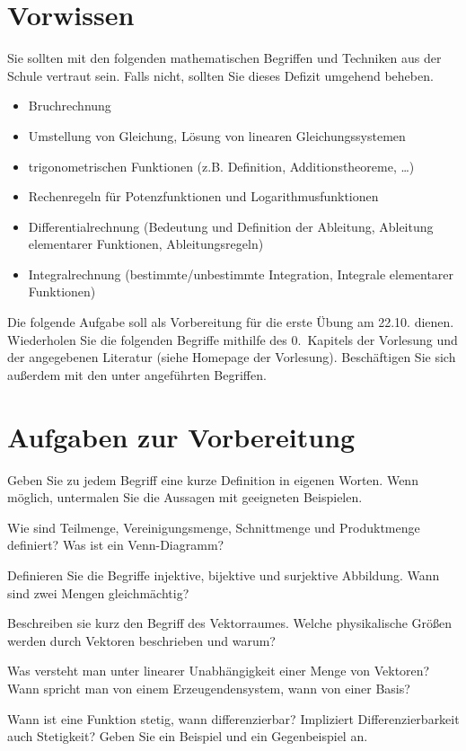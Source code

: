 \documentclass[11pt]{scrartcl}
\begin{document}
\section*{Vorwissen}
Sie sollten mit den folgenden mathematischen Begriffen und Techniken aus der Schule vertraut sein. Falls nicht, sollten Sie dieses Defizit umgehend beheben.
\begin{itemize}
  \item Bruchrechnung
  \item Umstellung von Gleichung, Lösung von linearen Gleichungssystemen
  \item trigonometrischen Funktionen (z.B. Definition, Additionstheoreme, \ldots)
  \item Rechenregeln für Potenzfunktionen und Logarithmusfunktionen
  \item Differentialrechnung (Bedeutung und Definition der Ableitung, Ableitung elementarer Funktionen, Ableitungsregeln)
  \item Integralrechnung (bestimmte/unbestimmte Integration, Integrale elementarer Funktionen)
\end{itemize}
\vspace{1em}

Die folgende Aufgabe soll als Vorbereitung für die erste Übung am 22.10. dienen.
Wiederholen Sie die folgenden Begriffe mithilfe des 0.\ Kapitels der Vorlesung und der angegebenen Literatur (siehe Homepage der Vorlesung).
Beschäftigen Sie sich außerdem mit den unter  angeführten Begriffen.

\section*{Aufgaben zur Vorbereitung}
Geben Sie zu jedem Begriff eine kurze Definition in eigenen Worten.
Wenn möglich, untermalen Sie die Aussagen mit geeigneten Beispielen.

\begin{description}[leftmargin=1cm,labelindent=1cm]
  \item[Mengen] Wie sind Teilmenge, Vereinigungsmenge, Schnittmenge und Produktmenge definiert?
  Was ist ein Venn-Diagramm?
  \item[Abbildungen] Definieren Sie die Begriffe injektive, bijektive und surjektive Abbildung. 
  Wann sind zwei Mengen gleichmächtig?
  \item[Vektorraum] Beschreiben sie kurz den Begriff des Vektorraumes. 
  Welche physikalische Größen werden durch Vektoren beschrieben und warum?
  \item[Lineare Unabhängigkeit] Was versteht man unter linearer Unabhängigkeit einer Menge von Vektoren? 
  Wann spricht man von einem Erzeugendensystem, wann von einer Basis? 
  \item[Stetigkeit und Differenzierbarkeit] Wann ist eine Funktion stetig, wann differenzierbar? 
  Impliziert Differenzierbarkeit auch Stetigkeit? 
  Geben Sie ein Beispiel und ein Gegenbeispiel an.
\end{description}
\end{document}
